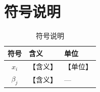 \section{符号说明}

\begin{table}[H]
  \centering
  \caption{符号说明}
  \label{tab:symbols}
  \begin{tabular}{cll}
    \toprule
    符号 & 含义 & 单位 \\
    \midrule
    $x_i$      & 【含义】 & 【单位】 \\
    $\beta_j$  & 【含义】 & --- \\
    \bottomrule
  \end{tabular}
\end{table}


